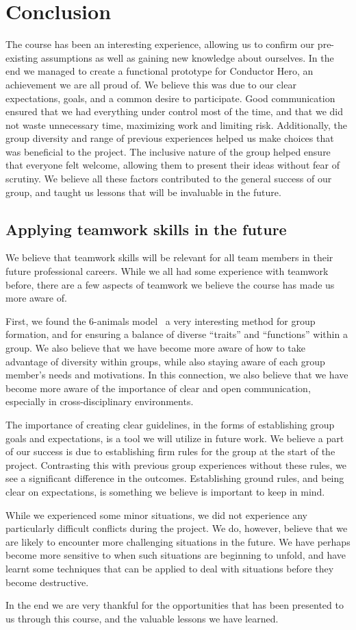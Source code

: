 \chapter{Conclusion}
The course has been an interesting experience, allowing us to confirm our pre-existing assumptions as well as gaining new knowledge about ourselves. In the end we managed to create a functional prototype for Conductor Hero, an achievement we are all proud of. We believe this was due to our clear expectations, goals, and a common desire to participate. Good communication ensured that we had everything under control most of the time, and that we did not waste unnecessary time, maximizing work and limiting risk. Additionally, the group diversity and range of previous experiences helped us make choices that was beneficial to the project. The inclusive nature of the group helped ensure that everyone felt welcome, allowing them to present their ideas without fear of scrutiny. We believe all these factors contributed to the general success of our group, and taught us lessons that will be invaluable in the future.

\section{Applying teamwork skills in the future}
We believe that teamwork skills will be relevant for all team members in their future professional careers. While we all had some experience with teamwork before, there are a few aspects of teamwork we believe the course has made us more aware of.

First, we found the 6-animals model~\cite{six_animal_model} a very interesting method for group formation, and for ensuring a balance of diverse “traits” and “functions” within a group. We also believe that we have become more aware of how to take advantage of diversity within groups, while also staying aware of each group member’s needs and motivations. In this connection, we also believe that we have become more aware of the importance of clear and open communication, especially in cross-disciplinary environments. 

The importance of creating clear guidelines, in the forms of establishing group goals and expectations, is a tool we will utilize in future work. We believe a part of our success is due to establishing firm rules for the group at the start of the project. Contrasting this with previous group experiences without these rules, we see a significant difference in the outcomes. Establishing ground rules, and being clear on expectations, is something we believe is important to keep in mind.

While we experienced some minor situations, we did not experience any particularly difficult conflicts during the project. We do, however, believe that we are likely to encounter more challenging situations in the future. We have perhaps become more sensitive to when such situations are beginning to unfold, and have learnt some techniques that can be applied to deal with situations before they become destructive. 

In the end we are very thankful for the opportunities that has been presented to us through this course, and the valuable lessons we have learned.
